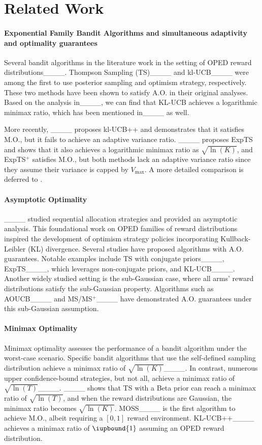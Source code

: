 \section{Related Work}
\label{sec:related}

\paragraph{Exponential Family Bandit Algorithms and simultaneous adaptivity and optimality guarantees} Several bandit algorithms in the literature work in the setting of OPED reward distributions____. 
Thompson Sampling 
(TS)____ and kl-UCB____ were among the first to use posterior sampling and optimism strategy, respectively. 
These two methods have been shown to satisfy A.O. in their original analyses. 
Based on the analysis in____, we can find that KL-UCB achieves a logarithmic minimax ratio, which has been mentioned in____ as well.


More recently, ____ proposes kl-UCB++ and demonstrates that it satisfies M.O., but it fails to achieve an adaptive variance ratio. 
____ proposes ExpTS and shows that it also achieves a logarithmic minimax ratio as $\sqrt{\ln(K)}$, and ExpTS$^+$ satisfies M.O., but both methods lack an adaptive variance ratio since they assume their variance is capped by $V_{\max}$. 
A more detailed comparison is deferred to .


\paragraph{Asymptotic Optimality} ____ studied sequential allocation strategies and provided an asymptotic analysis. This foundational work on OPED families of reward distributions inspired the development of optimism strategy policies incorporating Kullback-Leibler (KL) divergence.
Several studies have proposed algorithms with A.O. guarantees. Notable examples include TS with conjugate priors____, ExpTS____, which leverages non-conjugate priors, and KL-UCB____. Another widely studied setting is the sub-Gaussian case, where all arms' reward distributions satisfy the sub-Gaussian property. Algorithms such as AOUCB____ and MS/MS$^+$____ have demonstrated A.O. guarantees under this sub-Gaussian assumption.


\paragraph{Minimax Optimality} Minimax optimality assesses the performance of a bandit algorithm under the worst-case scenario. Specific bandit algorithms that use the self-defined sampling distribution achieve a minimax ratio of $\sqrt{\ln(K)}$____. In contrast, numerous upper confidence-bound strategies, but not all, achieve a minimax ratio of $\sqrt{\ln(T)}$____. 
____ shows that TS with a Beta prior can reach a minimax ratio of $\sqrt{\ln(T)}$, and when the reward distributions are Gaussian, the minimax ratio becomes $\sqrt{\ln(K)}$. MOSS____ is the first algorithm to achieve M.O., albeit requiring a $[0, 1]$ reward environment. KL-UCB++____ achieves a minimax ratio of $\iupbound{1}$ assuming an OPED reward distribution. 


